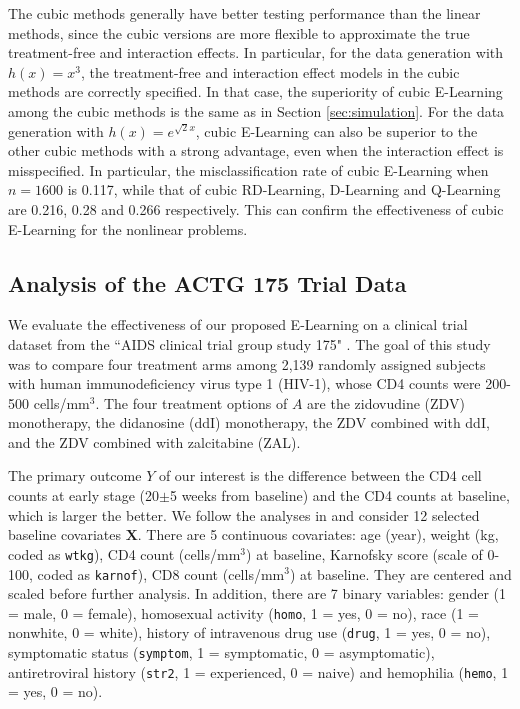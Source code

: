 \documentclass[11pt]{article}
\numberwithin{equation}{section}
\theoremstyle{definition}
\theoremstyle{remark}
\newcommand{\bX}{\bm{X}}
\begin{document}
The cubic methods generally have better testing performance than the linear methods, since the cubic versions are more flexible to approximate the true treatment-free and interaction effects. In particular, for the data generation with $ h(x) = x^{3} $, the treatment-free and interaction effect models in the cubic methods are correctly specified. In that case, the superiority of cubic E-Learning among the cubic methods is the same as in Section \ref{sec:simulation}. For the data generation with $ h(x) = e^{\sqrt{2}x} $, cubic E-Learning can also be superior to the other cubic methods with a strong advantage, even when the interaction effect is misspecified. In particular, the misclassification rate of cubic E-Learning when $ n = 1600 $ is 0.117, while that of cubic RD-Learning, D-Learning and Q-Learning are 0.216, 0.28 and 0.266 respectively. This can confirm the effectiveness of cubic E-Learning for the nonlinear problems.
\newpage

\subsection{Analysis of the ACTG 175 Trial Data}\label{sec:ACTG175}
We evaluate the effectiveness of our proposed E-Learning on a clinical trial dataset from the ``AIDS clinical trial group study 175" \citep{hammer1996trial}. The goal of this study was to compare four treatment arms among 2,139 randomly assigned subjects with human immunodeficiency virus type 1 (HIV-1), whose CD4 counts were 200-500 cells/mm$ ^{3} $. The four treatment options of $ A $ are the zidovudine (ZDV) monotherapy, the didanosine (ddI) monotherapy, the ZDV combined with ddI, and the ZDV combined with zalcitabine (ZAL). 

The primary outcome $ Y $ of our interest is the difference between the CD4 cell counts at early stage (20$ \pm $5 weeks from baseline) and the CD4 counts at baseline, which is larger the better. We follow the analyses in \citet{lu2013variable,qi2020multi,meng2020robust} and consider 12 selected baseline covariates $ \bX $. There are 5 continuous covariates: age (year), weight (kg, coded as \texttt{wtkg}), CD4 count (cells/mm$ ^{3} $) at baseline, Karnofsky score (scale of 0-100, coded as \texttt{karnof}), CD8 count (cells/mm$ ^{3} $) at baseline. They are centered and scaled before further analysis. In addition, there are 7 binary variables: gender (1 = male, 0 = female), homosexual activity (\texttt{homo}, 1 = yes, 0 = no), race (1 = nonwhite, 0 = white), history of intravenous drug use (\texttt{drug}, 1 = yes, 0 = no), symptomatic status (\texttt{symptom}, 1 = symptomatic, 0 = asymptomatic), antiretroviral history (\texttt{str2}, 1 = experienced, 0 = naive) and hemophilia (\texttt{hemo}, 1 = yes, 0 = no). 
\end{document}

